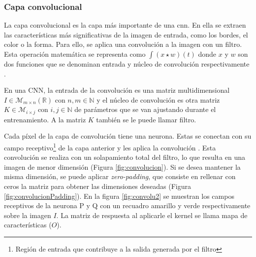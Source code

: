 \subsubsection*{Capa convolucional}

La capa convolucional es la capa más importante de una \acrshort{cnn}. En ella se extraen las características más significativas de la imagen de entrada, como los bordes, el color o la forma. Para ello, se aplica una convolución a la imagen con un filtro. Esta operación matemática se representa como \( \int (x \star w)(t) \) donde $x$ y $w$ son dos funciones que se denominan entrada y núcleo de convolución respectivamente \citep{pajares2021aprendizaje}.


En una CNN, la entrada de la convolución es una matriz multidimensional $I \in \mathcal{M}_{m\times n}(\mathbb{R})$ con $n,m \in \mathbb{N}$ y el núcleo de convolución es otra matriz $K \in \mathcal{M}_{i\times j}$ con $i,j \in \mathbb{N}$ de parámetros que se van ajustando durante el entrenamiento. A la matriz $K$ también se le puede llamar filtro. 

Cada píxel de la capa de convolución tiene una neurona. Estas se conectan con su campo receptivo\footnote{Región de entrada que contribuye a la salida generada por el filtro} de la capa anterior y les aplica la convolución \cite{geron2022hands}. Esta convolución se realiza con un solapamiento total del filtro, lo que resulta en una imagen de menor dimensión (Figura \ref{fig:convolucion}). Si se desea mantener la misma dimensión, se puede aplicar \textit{zero-padding}, que consiste en rellenar con ceros la matriz para obtener las dimensiones deseadas (Figura \ref{fig:convolucionPadding}). En la figura \ref{fig:convolu2} se muestran los campos receptivos de la neurona P y Q con un recuadro amarillo y verde respectivamente sobre la imagen $I$. La matriz de respuesta al aplicarle el kernel se llama mapa de características ($O$).


